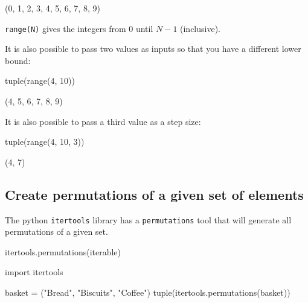 \begin{raw}
(0, 1, 2, 3, 4, 5, 6, 7, 8, 9)
\end{raw}






\texttt{range(N)} gives the integers from 0 until \(N - 1\) (inclusive).



It is also possible to pass two values as inputs so that you have a different lower bound:




\begin{pyin}
tuple(range(4, 10))
\end{pyin}





\begin{raw}
(4, 5, 6, 7, 8, 9)
\end{raw}





It is also possible to pass a third value as a step size:




\begin{pyin}
tuple(range(4, 10, 3))
\end{pyin}





\begin{raw}
(4, 7)
\end{raw}





\subsection{Create permutations of a given set of elements}
\label{\detokenize{tools-for-mathematics/05-combinations-permutations/how/main:creating-permutations-of-a-given-set-of-elements}}

The python \texttt{itertools} library has a \texttt{permutations} tool that will generate all
permutations of a given set.


\begin{pyin}
itertools.permutations(iterable)
\end{pyin}





\begin{pyin}
import itertools

basket = ("Bread", "Biscuits", "Coffee")
tuple(itertools.permutations(basket))
\end{pyin}





